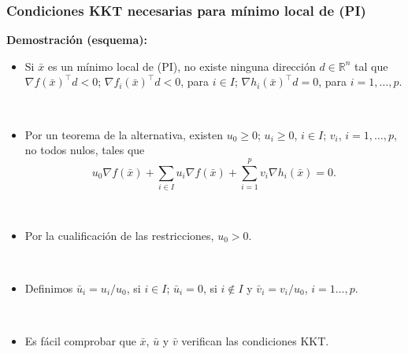 \documentclass{beamer}
\begin{document}
\begin{frame}
\frametitle{Condiciones KKT necesarias para mínimo local de (PI)}



\textbf{Demostración (esquema):} 

\begin{itemize}
\item Si $\bar{x}$ es un mínimo local de (PI), no existe ninguna dirección $d\in\mathbb{R}^n$ tal que $\nabla f(\bar{x})^\top d<0$; $\nabla f_i(\bar{x})^\top d<0$, para $i\in I$; $\nabla h_i(\bar{x})^\top d = 0$, para $i=1,\ldots,p$.

\

\item Por un teorema de la alternativa, existen $u_0\geq 0$; $u_i\geq 0$, $i\in I$; $v_i$, $i=1,\ldots,p$,  no todos nulos, tales que 
\[
u_0\nabla f(\bar{x}) + \sum_{i\in I}u_i\nabla f(\bar{x})+\sum_{i=1}^p v_i\nabla h_i(\bar{x})=0.
\]

\

\item Por la cualificación de las restricciones, $u_0 > 0$.

\

\item Definimos  $\bar{u}_i=u_i/u_0$, si $i\in I$; $\bar{u}_i=0$, si $i\notin I$ y
$\bar{v}_i=v_i/u_0$, $i=1\ldots,p$.

\

\item Es fácil comprobar que $\bar{x}$, $\bar{u}$ y $\bar{v}$ verifican las condiciones KKT. 
\end{itemize}



\end{frame}
\end{document}
